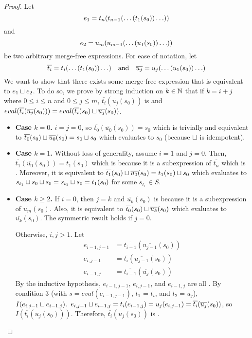 \newcommand{\bart}[1]{\overline{t_{#1}}}
\newcommand{\baru}[1]{\overline{u_{#1}}}
\newcommand{\bartu}[2]{\bart{#1}(\baru{#2}(s_0))}
\begin{proof}
  Let
  \[
    \hfill
    e_1 = t_n(t_{n-1}(\ldots (t_1(s_0))\ldots))
    \hfill
  \]
  and
  \[
    \hfill
    e_2 = u_m(u_{m-1}(\ldots (u_1(s_0))\ldots))
    \hfill
  \]
  be two arbitrary merge-free \sTIreachable{} expressions.
  For ease of notation, let
  \[
    \hfill
    \bart{i} = t_i(\ldots(t_1(s_0))\ldots)
    \quad\text{and}\quad
    \baru{j} = u_j(\ldots(u_1(s_0))\ldots)
    \hfill
  \]
  We want to show that there exists some merge-free \sTIreachable{} expression
  that is equivalent to $e_1 \sqcup e_2$.
  To do so, we prove by strong induction on $k \in \mathbb{N}$ that if $k = i + j$
  where $0 \leq i \leq n$ and $0 \leq j \leq m$, $\bartu{i}{j}$ is
  \sTIreachable{} and $eval(\bartu{i}{j}) = eval(\bart{i}(s_0) \join
  \baru{j}(s_0))$.
  \begin{itemize}
    \item \textbf{Case $k = 0$.}
      $i = j = 0$, so $\bartu{0}{0} = s_0$ which is trivially \sTIreachable{}
      and equivalent to $\bart{0}(s_0) \join \baru{0}(s_0) = s_0 \join s_0$
      which evaluates to $s_0$ (because $\sqcup$ is idempotent).

    \item \textbf{Case $k = 1$.}
      Without loss of generality, assume $i = 1$ and $j = 0$. Then,
      $
        \bartu{1}{0} = t_1(s_0)
      $ which is \sTIreachable{} because it is a subexpression of $\bart{n}$
      which is \sTIreachable{}. Moreover, it is equivalent to $\bart{1}(s_0)
      \join \baru{0}(s_0) = t_1(s_0) \join s_0$ which evaluates to $s_{t_1}
      \sqcup s_0 \sqcup s_0 = s_{t_1} \sqcup s_0 = t_1(s_0)$ for some $s_{t_1} \in
      S$.

    \item \textbf{Case $k \geq 2$.}
      If $i = 0$, then $j = k$ and $\baru{k}(s_0)$ is \sTIreachable{} because
      it is a subexpression of $\baru{m}(s_0)$. Also, it is equivalent to
      $\bart{0}(s_0) \join \baru{k}(s_0)$ which evaluates to $\baru{k}(s_0)$.
      The symmetric result holds if $j = 0$.

      Otherwise, $i, j > 1$. Let
      \begin{align*}
        e_{i-1,j-1} &= \bartu{i-1}{j-1} \\
        e_{i,j-1} &= \bartu{i}{j-1} \\
        e_{i-1,j} &= \bartu{i-1}{j}
      \end{align*}
      By the inductive hypothesis, $e_{i-1,j-1}$, $e_{i,j-1}$, and $e_{i-1,j}$
      are all \sTIreachable{}. By condition 3 (with $s = eval(e_{i-1,j-1})$,
      $t_1$ = $t_i$, and $t_2 = u_j$), $I(e_{i,j-1} \sqcup e_{i-1,j})$.
      $e_{i,j-1} \join e_{i-1,j} = t_i(e_{i-1,j}) = u_j(e_{i,j-1}) =
      \bartu{i}{j}$, so $I(\bartu{i}{j})$. Therefore, $\bartu{i}{j}$ is
      \sTIreachable{}.
  \end{itemize}
\end{proof}

